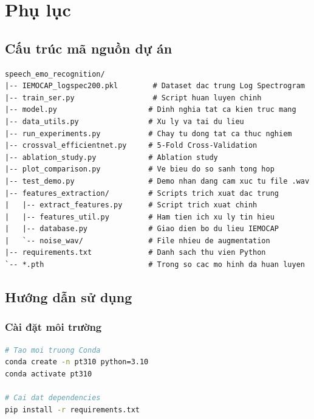 \appendix
\chapter{Phụ lục}
\label{chap:appendix}

\section{Cấu trúc mã nguồn dự án}
\label{sec:code_structure}

\begin{lstlisting}[language={}, caption={Cấu trúc thư mục mã nguồn}, label={lst:project_structure}]
speech_emo_recognition/
|-- IEMOCAP_logspec200.pkl        # Dataset dac trung Log Spectrogram
|-- train_ser.py                  # Script huan luyen chinh
|-- model.py                     # Dinh nghia tat ca kien truc mang
|-- data_utils.py                # Xu ly va tai du lieu
|-- run_experiments.py           # Chay tu dong tat ca thuc nghiem
|-- crossval_efficientnet.py     # 5-Fold Cross-Validation
|-- ablation_study.py            # Ablation study
|-- plot_comparison.py           # Ve bieu do so sanh tong hop
|-- test_demo.py                 # Demo nhan dang cam xuc tu file .wav
|-- features_extraction/         # Scripts trich xuat dac trung
|   |-- extract_features.py      # Script trich xuat chinh
|   |-- features_util.py         # Ham tien ich xu ly tin hieu
|   |-- database.py              # Giao dien bo du lieu IEMOCAP
|   `-- noise_wav/               # File nhieu de augmentation
|-- requirements.txt             # Danh sach thu vien Python
`-- *.pth                        # Trong so cac mo hinh da huan luyen
\end{lstlisting}

\section{Hướng dẫn sử dụng}
\label{sec:usage_guide}

\subsection{Cài đặt môi trường}

\begin{lstlisting}[language=bash, caption={Cài đặt môi trường Python}]
# Tao moi truong Conda
conda create -n pt310 python=3.10
conda activate pt310

# Cai dat dependencies
pip install -r requirements.txt
\end{lstlisting}

